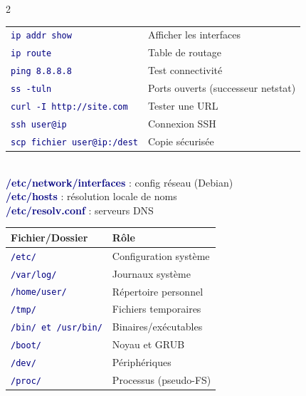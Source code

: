\documentclass[a4paper,10pt]{article}
\newcommand{\key}[1]{\textbf{\textcolor{navy}{#1}}}
\newcommand{\cmd}[1]{\texttt{\textcolor{navy}{#1}}}
\begin{document}
\begin{multicols}{2}
\begin{tcolorbox}[basebox, colframe=crimson, title=7. Réseau sous Linux]
\begin{tabular}{ll}
\toprule
\cmd{ip addr show} & Afficher les interfaces \\
\cmd{ip route} & Table de routage \\
\cmd{ping 8.8.8.8} & Test connectivité \\
\cmd{ss -tuln} & Ports ouverts (successeur netstat) \\
\cmd{curl -I http://site.com} & Tester une URL \\
\cmd{ssh user@ip} & Connexion SSH \\
\cmd{scp fichier user@ip:/dest} & Copie sécurisée \\
\bottomrule
\end{tabular}
\vspace{4pt}\\
\key{/etc/network/interfaces} : config réseau (Debian) \\
\key{/etc/hosts} : résolution locale de noms \\
\key{/etc/resolv.conf} : serveurs DNS
\end{tcolorbox}

\begin{tcolorbox}[basebox, colframe=orange, title=8. Fichiers importants du système]
\begin{tabular}{ll}
\toprule
\textbf{Fichier/Dossier} & \textbf{Rôle} \\
\midrule
\cmd{/etc/} & Configuration système \\
\cmd{/var/log/} & Journaux système \\
\cmd{/home/user/} & Répertoire personnel \\
\cmd{/tmp/} & Fichiers temporaires \\
\cmd{/bin/ et /usr/bin/} & Binaires/exécutables \\
\cmd{/boot/} & Noyau et GRUB \\
\cmd{/dev/} & Périphériques \\
\cmd{/proc/} & Processus (pseudo-FS) \\
\bottomrule
\end{tabular}
\end{tcolorbox}


\end{multicols}
\end{document}
